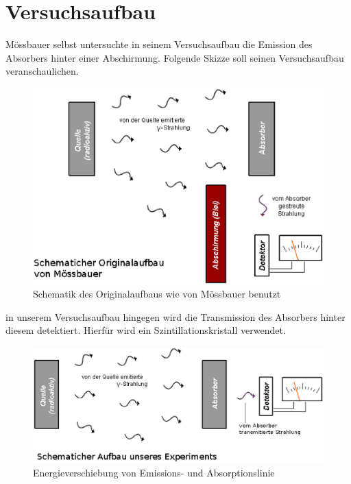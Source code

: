 \documentclass[12pt]{article}
\begin{document}
\section{Versuchsaufbau}

Mössbauer selbst untersuchte in seinem Versuchsaufbau die Emission des Absorbers hinter einer Abschirmung. Folgende Skizze soll seinen Versuchsaufbau veranschaulichen.

\begin{figure}[H]
 \includegraphics[width=0.9\linewidth]{pictures/moessbauer_original_aufbau.eps}
 \caption{Schematik des Originalaufbaus wie von Mössbauer benutzt}
\end{figure}

in unserem Versuchsaufbau hingegen wird die Transmission des Absorbers hinter diesem detektiert. Hierfür wird ein Szintillationskristall verwendet.

\begin{figure}[H]
 \includegraphics[width=0.9\linewidth]{pictures/unser_aufbau.eps}
 \caption{Energieverschiebung von Emissions- und Absorptionslinie}
\end{figure}
\end{document}
